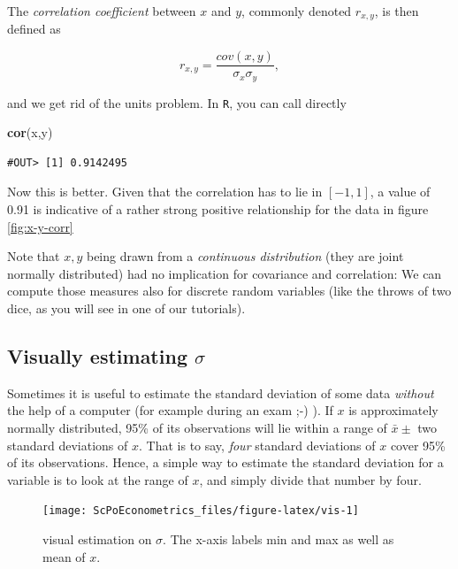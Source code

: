 \documentclass[]{book}
\newenvironment{Shaded}{\begin{snugshade}}{\end{snugshade}}
\newcommand{\KeywordTok}[1]{\textcolor[rgb]{0.13,0.29,0.53}{\textbf{#1}}}
\newcommand{\NormalTok}[1]{#1}
\begin{document}
The \emph{correlation coefficient} between \(x\) and \(y\), commonly denoted \(r_{x,y}\), is then defined as

\[
r_{x,y} = \frac{cov(x,y)}{\sigma_x \sigma_y},
\]

and we get rid of the units problem. In \texttt{R}, you can call directly

\begin{Shaded}
\begin{Highlighting}[]
\KeywordTok{cor}\NormalTok{(x,y)}
\end{Highlighting}
\end{Shaded}

\begin{verbatim}
#OUT> [1] 0.9142495
\end{verbatim}

Now this is better. Given that the correlation has to lie in \([-1,1]\), a value of 0.91 is indicative of a rather strong positive relationship for the data in figure \ref{fig:x-y-corr}

Note that \(x,y\) being drawn from a \emph{continuous distribution} (they are joint normally distributed) had no implication for covariance and correlation: We can compute those measures also for discrete random variables (like the throws of two dice, as you will see in one of our tutorials).

\hypertarget{visually-estimating-sigma}{%
\subsection{\texorpdfstring{Visually estimating \(\sigma\)}{Visually estimating \textbackslash sigma}}\label{visually-estimating-sigma}}

Sometimes it is useful to estimate the standard deviation of some data \emph{without} the help of a computer (for example during an exam ;-) ). If \(x\) is approximately normally distributed, 95\% of its observations will lie within a range of \(\bar{x}\pm\) two standard deviations of \(x\). That is to say, \emph{four} standard deviations of \(x\) cover 95\% of its observations. Hence, a simple way to estimate the standard deviation for a variable is to look at the range of \(x\), and simply divide that number by four.

\begin{figure}

{\centering \texttt{[image: ScPoEconometrics\_files/figure-latex/vis-1]} 

}

\caption{visual estimation on $\sigma$. The x-axis labels min and max as well as mean of $x$.}\label{fig:vis}
\end{figure}
\end{document}
